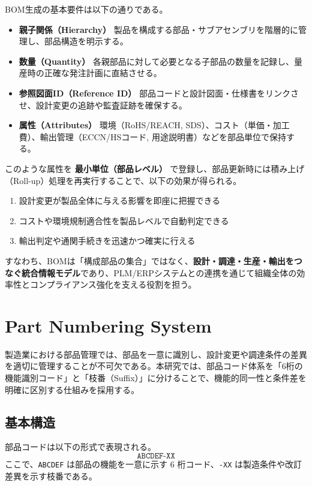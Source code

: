 \documentclass[10pt,conference]{IEEEtran}
\begin{document}
BOM生成の基本要件は以下の通りである。
\begin{itemize}
  \item \textbf{親子関係（Hierarchy）}  
  製品を構成する部品・サブアセンブリを階層的に管理し、部品構造を明示する。
  \item \textbf{数量（Quantity）}  
  各親部品に対して必要となる子部品の数量を記録し、量産時の正確な発注計画に直結させる。
  \item \textbf{参照図面ID（Reference ID）}  
  部品コードと設計図面・仕様書をリンクさせ、設計変更の追跡や監査証跡を確保する。
  \item \textbf{属性（Attributes）}  
  環境（RoHS/REACH, SDS）、コスト（単価・加工費）、輸出管理（ECCN/HSコード, 用途説明書）などを部品単位で保持する。
\end{itemize}

このような属性を \textbf{最小単位（部品レベル）} で登録し、部品更新時には積み上げ（Roll-up）処理を再実行することで、以下の効果が得られる。
\begin{enumerate}
  \item 設計変更が製品全体に与える影響を即座に把握できる  
  \item コストや環境規制適合性を製品レベルで自動判定できる  
  \item 輸出判定や通関手続きを迅速かつ確実に行える  
\end{enumerate}

すなわち、BOMは「構成部品の集合」ではなく、\textbf{設計・調達・生産・輸出をつなぐ統合情報モデル}であり、PLM/ERPシステムとの連携を通じて組織全体の効率性とコンプライアンス強化を支える役割を担う。

\section{Part Numbering System}
製造業における部品管理では、部品を一意に識別し、設計変更や調達条件の差異を適切に管理することが不可欠である。本研究では、部品コード体系を「6桁の機能識別コード」と「枝番（Suffix）」に分けることで、機能的同一性と条件差を明確に区別する仕組みを採用する。

\subsection{基本構造}
部品コードは以下の形式で表現される。
\[
\texttt{ABCDEF-XX}
\]
ここで、\texttt{ABCDEF} は部品の機能を一意に示す 6 桁コード、\texttt{-XX} は製造条件や改訂差異を示す枝番である。
\end{document}
